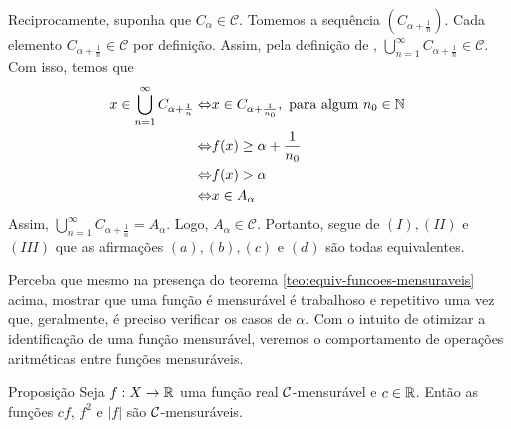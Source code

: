 \begin{prova}
Reciprocamente, suponha que $C_\alpha \in \mathcal{C}$. Tomemos a sequência $\left(C_{\alpha + \frac{1}{n}}\right)$.
Cada elemento $C_{\alpha +\frac{1}{n}} \in \mathcal{C}$ por definição.
Assim, pela definição de \sigal, 
$\displaystyle \bigcup_{n = 1}^\infty C_{\alpha +\frac{1}{n}} \in \mathcal{C}$. Com isso, temos que
\begin{align*}
    x \in \displaystyle \bigcup_{n = 1}^\infty C_{\alpha +\frac{1}{n}}
    \Leftrightarrow & x \in C_{\alpha + \frac{1}{n_0}}, \textrm{\ para algum  $n_0 \in \N$ }\\
    \Leftrightarrow & f(x)\geq \alpha +\dfrac{1}{n_0}\\
    \Leftrightarrow & f(x) > \alpha \\
    \Leftrightarrow & x \in A_\alpha
\end{align*}
Assim, $\displaystyle \bigcup_{n = 1}^\infty C_{\alpha +\frac{1}{n}} = A_\alpha$. Logo, $A_\alpha \in \mathcal{C}$.
Portanto, segue de $(I), (II)$ e $(III)$ que as afirmações $(a), (b), (c)$ e $(d)$ são todas equivalentes.


\end{prova}

Perceba que mesmo na presença do teorema \ref{teo:equiv-funcoes-mensuraveis} acima, mostrar que uma função é mensurável é trabalhoso e repetitivo uma vez que, geralmente, é preciso verificar os casos de $\alpha$.
Com o intuito de otimizar a identificação de uma função mensurável, veremos o comportamento de operações aritméticas entre funções mensuráveis.


\begin{resultado}{Proposição}
\label{prop:aritmetica-uma-funcao}
Seja $f: X \to \mathbb{R}$ uma função real $\operatorname{\mathcal{C}}$-mensurável e $c \in \mathbb{R}$. Então as funções $cf$, $f^2$ e $|f|$ são $\operatorname{\mathcal{C}}$-mensuráveis. 
\end{resultado}

